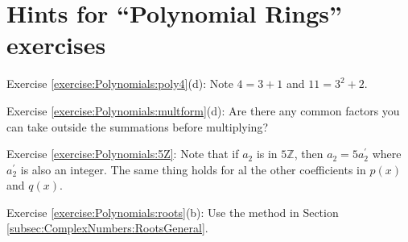\section{Hints for ``Polynomial Rings'' exercises}
\label{sec:Polynomials:Hints} 

\noindent Exercise \ref{exercise:Polynomials:poly4}(d):  Note $4=3+1$ and $11=3^2+2$.

\noindent Exercise \ref{exercise:Polynomials:multform}(d): Are there any common factors you can take outside 
the summations before multiplying?

\noindent Exercise \ref{exercise:Polynomials:5Z}:  Note that if  $a_2$ is in $5\mathbb{Z}$, then $a_2 = 5a_2^{\prime}$ where $a_2^{\prime}$ is also an integer.
The same thing holds for al the other coefficients in $p(x)$ and $q(x)$.

\noindent Exercise \ref{exercise:Polynomials:roots}(b):  Use the method in Section \ref{subsec:ComplexNumbers:RootsGeneral}.
 